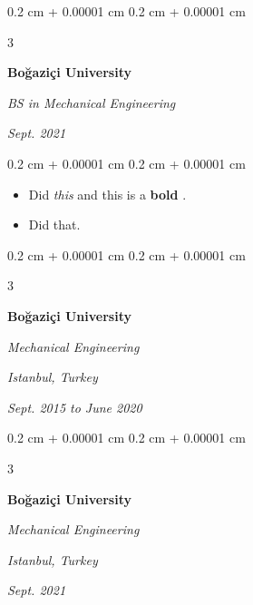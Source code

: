 \documentclass[10pt, letterpaper]{article}
\newenvironment{highlights}{
    \begin{itemize}[
        topsep=0.10 cm,
        parsep=0.10 cm,
        partopsep=0pt,
        itemsep=0pt,
        leftmargin=0.4 cm + 10pt + 0.6 cm
    ]
}{
    \end{itemize}
} %
\newenvironment{onecolentry}{
    \begin{adjustwidth}{
        0.2 cm + 0.00001 cm
    }{
        0.2 cm + 0.00001 cm
    }
}{
    \end{adjustwidth}
} %
\newenvironment{threecolentry}[3][]{
    \onecolentry
    \def\thirdColumn{#3}
    \setcolumnwidth{0.6 cm, \fill, 4.5 cm}
    \begin{paracol}{3}
    #2 \switchcolumn
}{
    \switchcolumn \raggedleft \thirdColumn
    \end{paracol}
    \endonecolentry
} %
\let\hrefWithoutArrow\href
\renewcommand{\href}[2]{\hrefWithoutArrow{#1}{\mbox{\ifthenelse{\equal{#2}{}}{ }{#2 }\raisebox{.15ex}{\footnotesize \faExternalLink*}}}}
\begin{document}
        \vspace{0.2 cm-3px}

        \begin{threecolentry}{
            \vspace*{\fill}
            \textbullet
            \vspace*{3px}
            \vspace*{\fill}
        }{
            
            
        \textit{Sept. 2021}}
            \textbf{Boğaziçi University}

            \textit{BS in Mechanical Engineering}
        \end{threecolentry}

        \vspace{0.10 cm-3px}
        \begin{onecolentry}
            \begin{highlights}
                \item Did \textit{this} and this is a \textbf{bold} \href{https://example.com}{link}.
                \item Did that.
            \end{highlights}
        \end{onecolentry}


        \vspace{0.2 cm-3px}

        \begin{threecolentry}{
            \vspace*{\fill}
            \textbullet
            \vspace*{3px}
            \vspace*{\fill}
        }{
        \textit{Istanbul, Turkey}    
            
        \textit{Sept. 2015 to June 2020}}
            \textbf{Boğaziçi University}

            \textit{Mechanical Engineering}
        \end{threecolentry}



        \vspace{0.2 cm-3px}

        \begin{threecolentry}{
            \vspace*{\fill}
            \textbullet
            \vspace*{3px}
            \vspace*{\fill}
        }{
        \textit{Istanbul, Turkey}    
            
        \textit{Sept. 2021}}
            \textbf{Boğaziçi University}

            \textit{Mechanical Engineering}
        \end{threecolentry}
\end{document}
